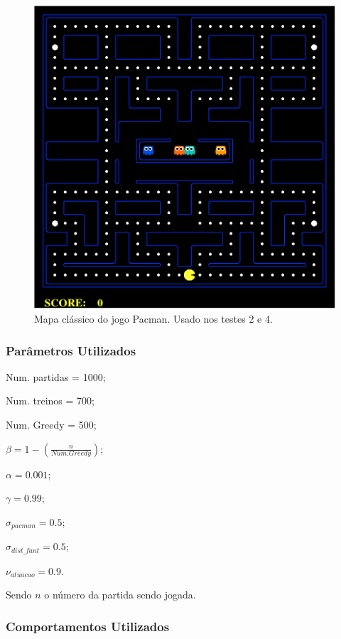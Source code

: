 \begin{figure}[h]
    \centering
    \includegraphics[width=120mm]{images/pacman_classical_map}
    \caption{Mapa clássico do jogo Pacman. Usado nos testes 2 e 4.}
    \label{img:PlataformaPacmanMapaClássico}
\end{figure}

\subsubsection{Parâmetros Utilizados}

\begin{multicols}{2}

Num. partidas = 1000;

Num. treinos = 700;

Num. Greedy = 500;

$ \beta = 1 - \left( \frac{n}{Num. Greedy} \right) $;

$ \alpha = 0.001 $;

$ \gamma = 0.99 $;

$ \sigma_{pacman} = 0.5 $;

$ \sigma_{dist\_fant} = 0.5 $;

$ \nu_{atuacao} = 0.9 $.

\end{multicols}

Sendo $ n $ o número da partida sendo jogada.

\subsubsection{Comportamentos Utilizados}

